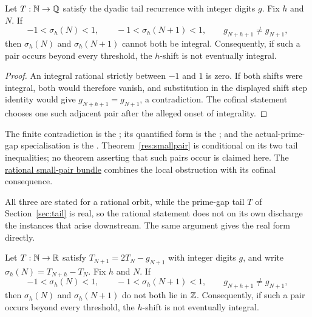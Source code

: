 \documentclass[11pt]{article}
\begin{document}
\begin{theorem}\label{res:smallpair}
Let $T:\mathbb{N}\to\mathbb{Q}$ satisfy the dyadic tail recurrence with integer digits $g$.
Fix $h$ and $N$.  If
\[
 -1<\sigma_h(N)<1,\qquad -1<\sigma_h(N+1)<1,
 \qquad g_{N+h+1}\ne g_{N+1},
\]
then $\sigma_h(N)$ and $\sigma_h(N+1)$ cannot both be integral.
Consequently, if such a pair occurs beyond every threshold, the $h$-shift is
not eventually integral.
\end{theorem}

\begin{proof}
An integral rational strictly between $-1$ and $1$ is zero.  If both shifts
were integral, both would therefore vanish, and substitution in the displayed
shift step identity would give $g_{N+h+1}=g_{N+1}$, a contradiction.  The
cofinal statement chooses one such adjacent pair after the alleged onset of
integrality.
\end{proof}

\noindent The finite contradiction is the
; its quantified form is the
; and the actual-prime-gap specialisation is the
.  Theorem~\ref{res:smallpair} is conditional on its two tail
inequalities; no theorem asserting that such pairs occur is claimed here.  The
\href{https://github.com/wcook04/plectis-erdos/blob/f36a98bf3d3e6f65f1074e3b800e3293d5b8a51a/ErdosProblems/Erdos251/PaperCoreR7.lean#L267}{rational small-pair bundle}
combines the local obstruction with its cofinal consequence.

All three are stated for a rational orbit, while the prime-gap tail
$T$ of Section~\ref{sec:tail} is real, so the rational statement does
not on its own discharge the instances that arise downstream.  The same
argument gives the real form directly.

\begin{corollary}\label{res:smallpair-real}
Let $T:\mathbb{N}\to\mathbb{R}$ satisfy $T_{N+1}=2T_N-g_{N+1}$ with integer digits $g$, and
write $\sigma_h(N)=T_{N+h}-T_N$.  Fix $h$ and $N$.  If
\[
 -1<\sigma_h(N)<1,\qquad -1<\sigma_h(N+1)<1,
 \qquad g_{N+h+1}\ne g_{N+1},
\]
then $\sigma_h(N)$ and $\sigma_h(N+1)$ do not both lie in $\mathbb{Z}$.
Consequently, if such a pair occurs beyond every threshold, the $h$-shift is
not eventually integral.
\end{corollary}
\end{document}
